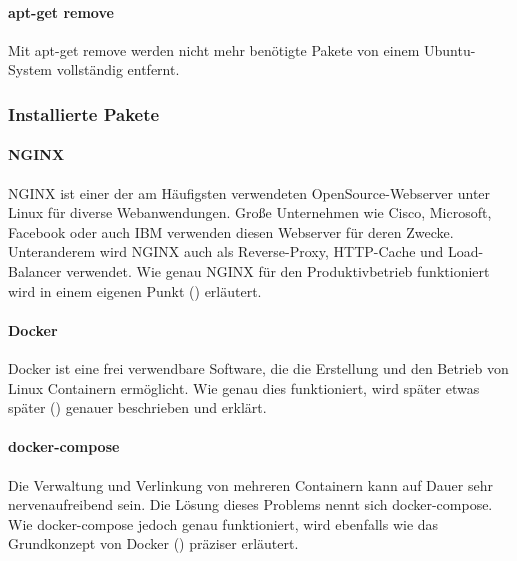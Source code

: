 \hypertarget{apt-get-remove}{%
\paragraph{apt-get remove}\label{apt-get-remove}}

Mit apt-get remove werden nicht mehr benötigte Pakete von einem
Ubuntu-System vollständig entfernt.

\hypertarget{installierte-pakete}{%
\subsubsection{Installierte Pakete}\label{installierte-pakete}}

\hypertarget{nginx}{%
\paragraph{NGINX}\label{nginx}}

NGINX ist einer der am Häufigsten verwendeten OpenSource-Webserver unter
Linux für diverse Webanwendungen. Große Unternehmen wie Cisco,
Microsoft, Facebook oder auch IBM verwenden diesen Webserver für deren
Zwecke. Unteranderem wird NGINX auch als Reverse-Proxy, HTTP-Cache und
Load-Balancer verwendet. Wie genau NGINX für den Produktivbetrieb
funktioniert wird in einem eigenen Punkt
() erläutert.

\hypertarget{docker}{%
\paragraph{Docker}\label{docker}}

Docker ist eine frei verwendbare Software, die die Erstellung und den
Betrieb von Linux Containern ermöglicht. Wie genau dies funktioniert,
wird später etwas später ()
genauer beschrieben und erklärt.

\hypertarget{docker-compose}{%
\paragraph{docker-compose}\label{docker-compose}}

Die Verwaltung und Verlinkung von mehreren Containern kann auf Dauer
sehr nervenaufreibend sein. Die Lösung dieses Problems nennt sich
docker-compose. Wie docker-compose jedoch genau funktioniert, wird
ebenfalls wie das Grundkonzept von Docker
() präziser erläutert.

